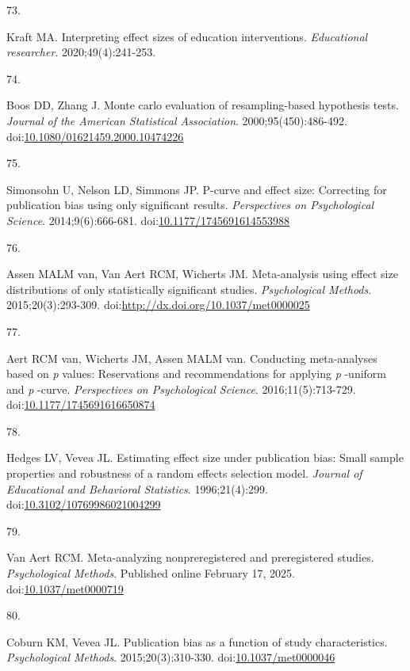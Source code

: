 \documentclass[
  american,
  man, donotrepeattitle,floatsintext]{apa7}
\newlength{\cslhangindent}
\newlength{\csllabelwidth}
\newenvironment{CSLReferences}[2] %
 {\begin{list}{}{%
  \setlength{\itemindent}{0pt}
  \setlength{\leftmargin}{0pt}
  \setlength{\parsep}{0pt}
  \ifodd #1
   \setlength{\leftmargin}{\cslhangindent}
   \setlength{\itemindent}{-1\cslhangindent}
  \fi
  \setlength{\itemsep}{#2\baselineskip}}}
 {\end{list}}
\newcommand{\CSLLeftMargin}[1]{\parbox[t]{\csllabelwidth}{\strut#1\strut}}
\newcommand{\CSLRightInline}[1]{\parbox[t]{\linewidth - \csllabelwidth}{\strut#1\strut}}
\begin{document}
\begin{CSLReferences}{0}{1}
\CSLLeftMargin{73. }%
\CSLRightInline{Kraft MA. Interpreting effect sizes of education interventions. \emph{Educational researcher}. 2020;49(4):241-253.}

\CSLLeftMargin{74. }%
\CSLRightInline{Boos DD, Zhang J. Monte carlo evaluation of resampling-based hypothesis tests. \emph{Journal of the American Statistical Association}. 2000;95(450):486-492. doi:\href{https://doi.org/10.1080/01621459.2000.10474226}{10.1080/01621459.2000.10474226}}

\CSLLeftMargin{75. }%
\CSLRightInline{Simonsohn U, Nelson LD, Simmons JP. P-curve and effect size: Correcting for publication bias using only significant results. \emph{Perspectives on Psychological Science}. 2014;9(6):666-681. doi:\href{https://doi.org/10.1177/1745691614553988}{10.1177/1745691614553988}}

\CSLLeftMargin{76. }%
\CSLRightInline{Assen MALM van, Van Aert RCM, Wicherts JM. {Meta-analysis using effect size distributions of only statistically significant studies}. \emph{Psychological Methods}. 2015;20(3):293-309. doi:\url{http://dx.doi.org/10.1037/met0000025}}

\CSLLeftMargin{77. }%
\CSLRightInline{Aert RCM van, Wicherts JM, Assen MALM van. Conducting meta-analyses based on \emph{p} values: Reservations and recommendations for applying \emph{p} -uniform and \emph{p} -curve. \emph{Perspectives on Psychological Science}. 2016;11(5):713-729. doi:\href{https://doi.org/10.1177/1745691616650874}{10.1177/1745691616650874}}

\CSLLeftMargin{78. }%
\CSLRightInline{Hedges LV, Vevea JL. {Estimating effect size under publication bias: Small sample properties and robustness of a random effects selection model}. \emph{Journal of Educational and Behavioral Statistics}. 1996;21(4):299. doi:\href{https://doi.org/10.3102/10769986021004299}{10.3102/10769986021004299}}

\CSLLeftMargin{79. }%
\CSLRightInline{Van Aert RCM. Meta-analyzing nonpreregistered and preregistered studies. \emph{Psychological Methods}. Published online February 17, 2025. doi:\href{https://doi.org/10.1037/met0000719}{10.1037/met0000719}}

\CSLLeftMargin{80. }%
\CSLRightInline{Coburn KM, Vevea JL. {Publication bias as a function of study characteristics}. \emph{Psychological Methods}. 2015;20(3):310-330. doi:\href{https://doi.org/10.1037/met0000046}{10.1037/met0000046}}


\end{CSLReferences}
\end{document}
